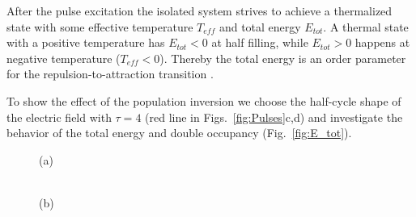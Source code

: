 After the pulse excitation the isolated system strives to achieve a thermalized state with some effective temperature $T_{eff}$ and total energy $E_{tot}$. A thermal state with a positive temperature has $E_{tot} < 0$ at half filling, while $E_{tot} > 0$ happens at negative temperature ($T_{eff} < 0$). Thereby the total energy is an order parameter for the repulsion-to-attraction transition \citep{PhysRevB.85.155124}.

To show the effect of the population inversion we choose the half-cycle shape of the electric field with $\tau = 4$ (red line in Figs.~\ref{fig:Pulses}c,d) and investigate the behavior of the total energy and double occupancy (Fig.~\ref{fig:E_tot}).
\begin{figure}[h!]
\begin{minipage}[h]{0.5\linewidth}
 (a) \\
\end{minipage}
\hfill
\begin{minipage}[h]{0.5\linewidth}
 \\(b)

\end{minipage}
\end{figure}
